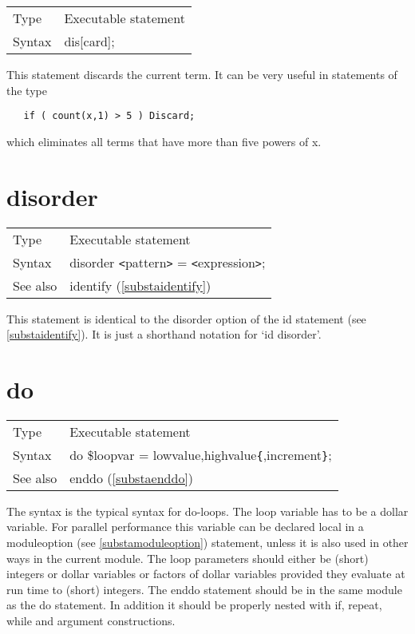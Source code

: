 \noindent \begin{tabular}{ll}
Type & Executable statement\\
Syntax & dis[card];
\end{tabular} \vspace{4mm}

\noindent This statement discards the current term. It can 
be very useful in statements of the type
\begin{verbatim}
   if ( count(x,1) > 5 ) Discard;
\end{verbatim}
which eliminates all terms that have more than five powers of x. 
\vspace{10mm}


\section{disorder}
\label{substadisorder}

\noindent \begin{tabular}{ll}
Type & Executable statement \\
Syntax & disorder {\tt<}pattern{\tt>} = {\tt<}expression{\tt>};
\\ See also & identify (\ref{substaidentify})
\end{tabular} \vspace{4mm}

\noindent This statement is identical to the disorder 
option of the id 
statement (see \ref{substaidentify}). It is just a shorthand notation for 
`id disorder'. \vspace{10mm}


\section{do}
\label{substado}

\noindent \begin{tabular}{ll}
Type & Executable statement\\
Syntax & do \$loopvar = lowvalue,highvalue\verb:{:,increment\verb:}:;
\\ See also & enddo (\ref{substaenddo})
\end{tabular} \vspace{4mm}

\noindent The syntax is the typical syntax for do-loops. The loop variable 
has to be a dollar variable. For parallel performance this variable can be 
declared local in a moduleoption (see \ref{substamoduleoption}) statement, 
unless it is also used in other ways in the current module. The loop 
parameters should either be (short) integers or dollar variables or factors 
of dollar variables provided they evaluate at run time to (short) integers. 
The enddo statement should be in the same module as the do statement. In 
addition it should be properly nested with if, repeat, while and argument 
constructions.


